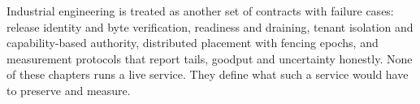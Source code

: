 Industrial engineering is treated as another set of contracts with failure cases: release identity and byte verification, readiness and draining, tenant isolation and capability-based authority, distributed placement with fencing epochs, and measurement protocols that report tails, goodput and uncertainty honestly. None of these chapters runs a live service. They define what such a service would have to preserve and measure.

